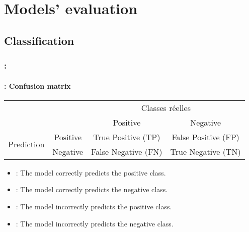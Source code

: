 \documentclass[xcolor=table]{beamer}
\begin{document}
\section{Models' evaluation}

\begin{frame}
	\frametitle{\insertshortsubtitle}
	\framesubtitle{\insertsection}
	
	
\end{frame}

\subsection{Classification}

\begin{frame}
	\frametitle{\insertshortsubtitle: \insertsection}
	\framesubtitle{\insertsubsection: Confusion matrix}
	
	\begin{tabular}{|c|c|c|c|}
		\cline{3-4}
		\multicolumn{2}{c|}{}& \multicolumn{2}{c|}{Classes réelles} \\
		\cline{3-4}
		\multicolumn{2}{c|}{}& Positive & Negative \\
		\hline
		\multirow{2}{*}{Prediction} & Positive & True Positive (TP) & False Positive (FP) \\
		\cline{2-4}
		& Negative & False Negative (FN) & True Negative (TN) \\
		\hline
	\end{tabular}

	\begin{itemize}
		\item {}: The model correctly predicts the positive class.
		\item {}: The model correctly predicts the negative class.
		\item {}: The model incorrectly predicts the positive class.
		\item {}: The model incorrectly predicts the negative class.
	\end{itemize}
	
\end{frame}
\end{document}
